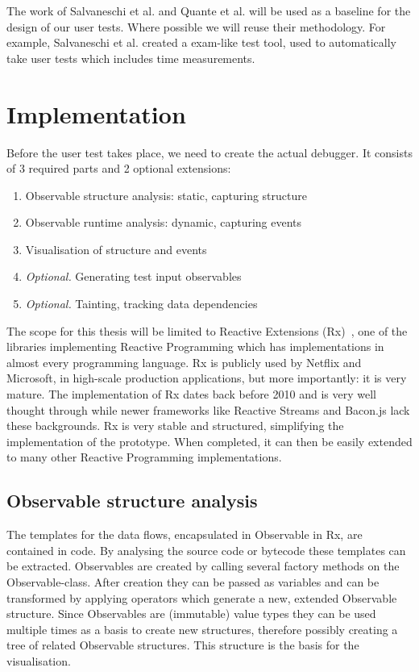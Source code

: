 The work of Salvaneschi et al.  and Quante et al.  will be used as a
baseline for the design of our user tests.  Where possible we will reuse
their methodology.  For example, Salvaneschi et al.  created a exam-like
test tool, used to automatically take user tests which includes time
measurements.

\section{Implementation}%
Before the user test takes place, we need to create the actual debugger.
It consists of 3 required parts and 2 optional extensions:

\begin{enumerate}
    \item
        Observable structure analysis:  static, capturing structure
    \item
        Observable runtime analysis:  dynamic, capturing events
    \item
        Visualisation of structure and events
    \item
        \textit{Optional.} Generating test input observables
    \item
        \textit{Optional.} Tainting, tracking data dependencies
\end{enumerate}

The scope for this thesis will be limited to Reactive Extensions (Rx)~\cite
{msdn_rx}, one of the libraries implementing Reactive Programming which
has implementations in almost every programming language.  Rx is
publicly used by Netflix and Microsoft, in high-scale production
applications, but more importantly:  it is very mature.  The
implementation of Rx dates back before 2010 and is very well thought
through while newer frameworks like Reactive Streams and Bacon.js lack
these backgrounds.  Rx is very stable and structured, simplifying the
implementation of the prototype.  When completed, it can then be easily
extended to many other Reactive Programming implementations.

\subsection{Observable structure analysis}%
The templates for the data flows, encapsulated in Observable in Rx, are
contained in code.  By analysing the source code or bytecode these
templates can be extracted.  Observables are created by calling several
factory methods on the Observable-class.  After creation they can be
passed as variables and can be transformed by applying operators which
generate a new, extended Observable structure.  Since Observables are (immutable)
value types they can be used multiple times as a basis to create new
structures, therefore possibly creating a tree of related Observable
structures.  This structure is the basis for the visualisation.

